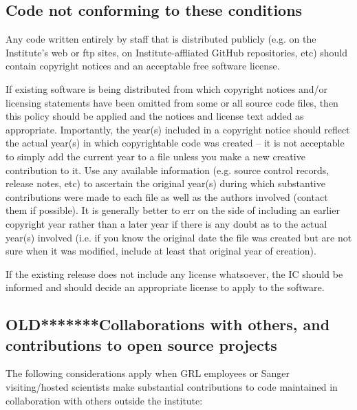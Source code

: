 \documentclass[10pt,a4paper]{article}
\begin{document}
\subsection{Code not conforming to these conditions}

\par Any code written entirely by staff that is distributed publicly (e.g. on the 
Institute's web or ftp sites, on Institute-affliated GitHub repositories, etc) 
should contain copyright notices and an acceptable free software license. 

\par If existing software is being distributed from which copyright notices 
and/or licensing statements have been omitted from some or all source 
code files, then this policy should be applied and the notices and license 
text added as appropriate. Importantly, the year(s) included in a copyright 
notice should reflect the actual year(s) in which copyrightable code was 
created -- it is not acceptable to simply add the current year to a file unless 
you make a new creative contribution to it. Use any available information 
(e.g. source control records, release notes, etc) to ascertain the original 
year(s) during which substantive contributions were made to each file as
well as the authors involved (contact them if possible). It is generally better 
to err on the side of including an earlier copyright year rather than a later 
year if there is any doubt as to the actual year(s) involved (i.e. if you know 
the original date the file was created but are not sure when it was modified, 
include at least that original year of creation). 

If the existing release does not include any license whatsoever, the IC should 
be informed and should decide an appropriate license to apply to the 
software. 


\subsection{OLD*******Collaborations with others, and contributions to open source projects}

The following considerations apply when GRL employees or Sanger visiting/hosted 
scientists make substantial contributions to code maintained in collaboration with 
others outside the institute: 
\end{document}
